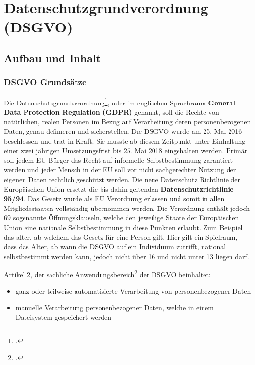 \chapter{Datenschutzgrundverordnung (DSGVO)}
\putz

\section{Aufbau und Inhalt}
\subsection{DSGVO Grundsätze}
Die Datenschutzgrundverordnung\footcite{dsgvo-wiki}, oder im englischen Sprachraum \textbf{General Data Protection Regulation (GDPR)} genannt, soll die Rechte von natürlichen, realen Personen im Bezug auf Verarbeitung deren personenbezogenen Daten, genau definieren und sicherstellen. Die DSGVO wurde am 25. Mai 2016 beschlossen und trat in Kraft. Sie musste ab diesem Zeitpunkt unter Einhaltung einer zwei jährigen Umsetzungsfrist bis 25. Mai 2018 eingehalten werden. Primär soll jedem EU-Bürger das Recht auf informelle Selbstbestimmung garantiert werden und jeder Mensch in der EU soll vor nicht sachgerechter Nutzung der eigenen Daten rechtlich geschützt werden.
Die neue Datenschutz Richtlinie der Europäischen Union ersetzt die bis dahin geltenden \textbf{Datenschutzrichtlinie 95/94}. Das Gesetz wurde als EU Verordnung erlassen und somit in allen Mitgliedsstaaten vollständig übernommen werden. Die Verordnung enthält jedoch 69 sogenannte Öffnungsklauseln, welche den jeweilige Staate der Europäischen Union eine nationale Selbstbestimmung in diese Punkten erlaubt. Zum Beispiel das alter, ab welchem das Gesetz für eine Person gilt. Hier gilt ein Spielraum, dass das Alter, ab wann die DSGVO auf ein Individuum zutrifft, national selbstbestimmt werden kann, jedoch nicht über 16 und nicht unter 13 liegen darf.

Artikel 2, der sachliche Anwendungsbereich\footcite{Lehrunterlagen-HTL-cloud} der DSGVO beinhaltet:
\begin{itemize}
	\item ganz oder teilweise automatisierte Verarbeitung von personenbezogener Daten
	\item manuelle Verarbeitung personenbezogener Daten, welche in einem Dateisystem gespeichert werden
\end{itemize}

